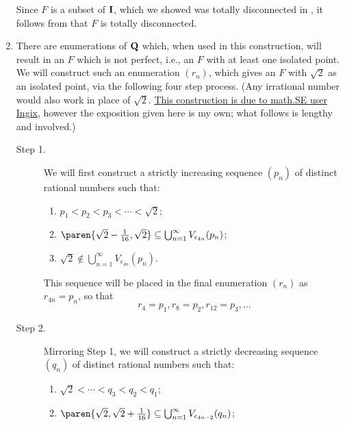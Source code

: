 \documentclass{lew98_solutions}
\begin{document}
\begin{solution}
\begin{enumerate}
        Since \( F \) is a subset of \( \mathbf{I} \), which we showed was totally disconnected in , it follows from  that \( F \) is totally disconnected.

        \item There are enumerations of \( \mathbf{Q} \) which, when used in this construction, will result in an \( F \) which is not perfect, i.e., an \( F \) with at least one isolated point. We will construct such an enumeration \( (r_n) \), which gives an \( F \) with \( \sqrt{2} \) as an isolated point, via the following four step process. (Any irrational number would also work in place of \( \sqrt{2} \). \href{https://math.stackexchange.com/questions/2854900/constructing-perfect-set-without-rationals-by-removing-open-neighborhood-around/2857460#2857460}{This construction is due to math.SE user Ingix}, however the exposition given here is my own; what follows is lengthy and involved.)
        \begin{description}
            \item[Step 1.] We will first construct a strictly increasing sequence \( (p_n) \) of distinct rational numbers such that:
            \begin{enumerate}[itemsep=8pt, leftmargin=44pt, label=(1.\arabic*)]
                \item \( p_1 < p_2 < p_3 < \cdots < \sqrt{2} \);

                \item \( \paren{ \sqrt{2} - \tfrac{1}{16}, \sqrt{2} } \subseteq \bigcup_{n=1}^{\infty} V_{\epsilon_{4n}}(p_n) \);

                \item \( \sqrt{2} \not\in \bigcup_{n=1}^{\infty} V_{\epsilon_{4n}}(p_n) \).
            \end{enumerate}
            This sequence will be placed in the final enumeration \( (r_n) \) as \( r_{4n} = p_n \), so that
            \[
                r_4 = p_1, r_8 = p_2, r_{12} = p_3, \ldots
            \]

            \item[Step 2.] Mirroring Step 1, we will construct a strictly decreasing sequence \( (q_n) \) of distinct rational numbers such that:
            \begin{enumerate}[itemsep=8pt, leftmargin=44pt, label=(2.\arabic*)]
                \item \( \sqrt{2} < \cdots < q_3 < q_2 < q_1 \);

                \item \( \paren{ \sqrt{2}, \sqrt{2} + \tfrac{1}{16} } \subseteq \bigcup_{n=1}^{\infty} V_{\epsilon_{4n-2}}(q_n) \);


\end{enumerate}
\end{description}
\end{enumerate}
\end{solution}
\end{document}

